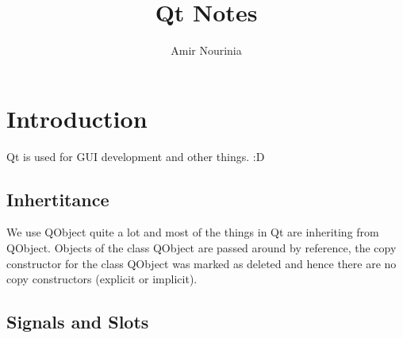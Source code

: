 \documentclass[11pt,twoside,a4paper]{report}
\title{Qt Notes}
\author{Amir Nourinia}
\begin{document}
\maketitle
\tableofcontents

\chapter{Introduction}
Qt is used for GUI development and other things. :D


\section{Inhertitance}
We use QObject quite  a lot and most of the things in Qt are inheriting from QObject. Objects of the class QObject are
passed around by reference, the copy constructor for the class QObject was marked as deleted and hence there are no copy constructors (explicit or implicit).



\section{Signals and Slots}
\end{document}
